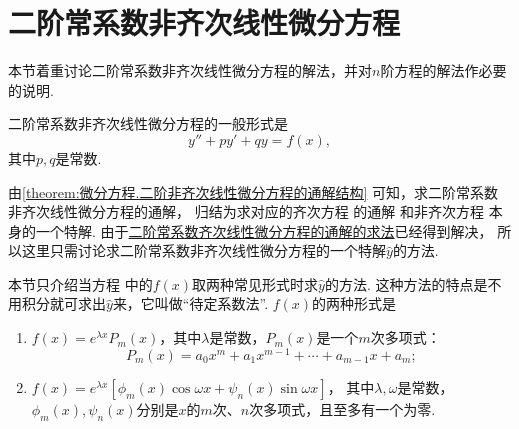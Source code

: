\section{二阶常系数非齐次线性微分方程}\label{section:微分方程.常系数非齐次线性微分方程}
本节着重讨论二阶常系数非齐次线性微分方程的解法，并对\(n\)阶方程的解法作必要的说明.

二阶常系数非齐次线性微分方程的一般形式是
\begin{equation}\label{equation:微分方程.二阶常系数非齐次线性微分方程的一般形式}
y'' + p y' + q y = f(x),
\end{equation}
其中\(p,q\)是常数.

由\cref{theorem:微分方程.二阶非齐次线性微分方程的通解结构} 可知，求二阶常系数非齐次线性微分方程的通解，
归结为求对应的齐次方程  的通解%
和非齐次方程  本身的一个特解.
由于\hyperref[section:微分方程.常系数齐次线性微分方程]{二阶常系数齐次线性微分方程的通解的求法}已经得到解决，
所以这里只需讨论求二阶常系数非齐次线性微分方程的一个特解\(\hat{y}\)的方法.

本节只介绍当方程  中的\(f(x)\)取两种常见形式时求\(\hat{y}\)的方法.
这种方法的特点是不用积分就可求出\(\hat{y}\)来，它叫做“待定系数法”.
\(f(x)\)的两种形式是\begin{enumerate}
\item \(f(x) = e^{\lambda x} P_m(x)\)，其中\(\lambda\)是常数，\(P_m(x)\)是一个\(m\)次多项式：\[
P_m(x) = a_0 x^m + a_1 x^{m-1} + \dotsb + a_{m-1} x + a_m;
\]

\item \(f(x) = e^{\lambda x} [ \phi_m(x) \cos\omega x + \psi_n(x) \sin \omega x ]\)，
其中\(\lambda,\omega\)是常数，\(\phi_m(x),\psi_n(x)\)分别是\(x\)的\(m\)次、\(n\)次多项式，且至多有一个为零.
\end{enumerate}

